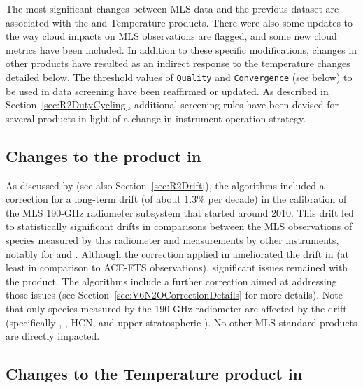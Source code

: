 The most significant changes between MLS \thisv data and the previous \prevv dataset are associated with the  and Temperature products. There were also some updates to the way cloud impacts on MLS observations are flagged, and some new cloud metrics have been included. In addition to these specific modifications, changes in other products have resulted as an indirect response to the temperature changes detailed below. The threshold values of \texttt{Quality} and \texttt{Convergence} (see below) to be used in data screening have been reaffirmed or updated. As described in Section~\ref{sec:R2DutyCycling}, additional screening rules have been devised for several products in light of a change in instrument operation strategy.

\subsection{Changes to the  product in \thisv}
\label{sec:V6N2OCorrectionBriefSummary}

As discussed by \citet{LiveseyEtal:2021:Drifts} (see also Section~\ref{sec:R2Drift}), the \prevv algorithms included a correction for a long-term drift (of about 1.3\% per decade) in the calibration of the MLS \mbox{190-GHz} radiometer subsystem that started around 2010. This drift led to statistically significant drifts in comparisons between the MLS \viv observations of species measured by this radiometer and measurements by other instruments, notably for  and . Although the correction applied in \prevv ameliorated the drift in  (at least in comparison to \mbox{ACE-FTS} observations), significant issues remained with the  product.  The \thisv algorithms include a further correction aimed at addressing those issues (see Section~\ref{sec:V6N2OCorrectionDetails} for more details).  Note that only species measured by the \mbox{190-GHz} radiometer are affected by the drift (specifically , , HCN, and upper stratospheric ).  No other MLS standard products are directly impacted.

\subsection{Changes to the Temperature product in \thisv}
\label{sec:V6TemperatureWork}


